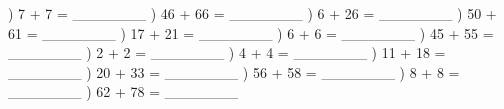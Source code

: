 \documentclass{article}%
\begin{document}
\newline%
\newline%
) 7 + 7 = \_\_\_\_\_\_\_%
\newline%
\newline%
) 46 + 66 = \_\_\_\_\_\_\_%
\newline%
\newline%
) 6 + 26 = \_\_\_\_\_\_\_%
\newline%
\newline%
) 50 + 61 = \_\_\_\_\_\_\_%
\newline%
\newline%
) 17 + 21 = \_\_\_\_\_\_\_%
\newline%
\newline%
) 6 + 6 = \_\_\_\_\_\_\_%
\newline%
\newline%
) 45 + 55 = \_\_\_\_\_\_\_%
\newline%
\newline%
) 2 + 2 = \_\_\_\_\_\_\_%
\newline%
\newline%
) 4 + 4 = \_\_\_\_\_\_\_%
\newline%
\newline%
) 11 + 18 = \_\_\_\_\_\_\_%
\newline%
\newline%
) 20 + 33 = \_\_\_\_\_\_\_%
\newline%
\newline%
) 56 + 58 = \_\_\_\_\_\_\_%
\newline%
\newline%
) 8 + 8 = \_\_\_\_\_\_\_%
\newline%
\newline%
) 62 + 78 = \_\_\_\_\_\_\_%
\newline%
\newline%
\end{document}
